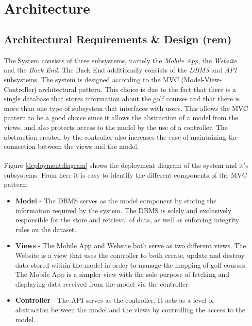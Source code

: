\documentclass{article}
\begin{document}

    \section{Architecture}

    \subsection{Architectural Requirements \& Design (rem)}

    \paragraph{}
    The System consists of three subsystems, namely the \textit{Mobile App}, the
    \textit{Website} and the \textit{Back End}. The Back End additionally
    consists of the \textit{DBMS} and \textit{API} subsystems. The system is
    designed according to the MVC (Model-View-Controller) architectural pattern.
    This choice is due to the fact that there is a single database that stores
    information about the golf courses and that there is more than one type of
    subsystem that interfaces with users. This allows the MVC pattern to be a
    good choice since it allows the abstraction of a model from the views, and
    also protects access to the model by the use of a controller. The
    abstraction created by the controller also increases the ease of maintaining
    the connection between the views and the model.

    \paragraph{}
    Figure \ref{deploymentdiagram} shows the deployment diagram of the system and it's
    subsystems. From here it is easy to identify the different components of the
    MVC pattern:

    \begin{itemize}
        \item \textbf{Model} - The DBMS serves as the model component by storing
            the information required by the system. The DBMS is solely and
            exclusively responsible for the store and retrieval of data,
            as well as enforcing integrity rules on the dataset.
        \item \textbf{Views} - The Mobile App and Website both serve as two
            different views. The Website is a view that uses the controller
            to both create, update and destroy data stored within the model
            in order to manage the mapping of golf courses. The Mobile App is
            a simpler view with the sole purpose of fetching and displaying
            data received from the model via the controller.
        \item \textbf{Controller} - The API serves as the controller. It acts
            as a level of abstraction between the model and the views by
            controlling the access to the model.
    \end{itemize}
\end{document}
